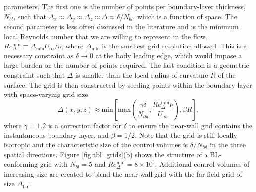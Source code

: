 \documentclass{ctr}
\begin{document}
\begin{itemize}
  parameters. The first one is the number of points per boundary-layer
  thickness, $N_{bl}$, such that $\Delta_x \approx \Delta_y \approx
  \Delta_z \approx \Delta \approx \delta/N_{bl}$, which is a function
  of space.  The second parameter is less often discussed in the
  literature and is the minimum local Reynolds number that we are
  willing to represent in the flow, $Re_{\Delta}^\mathrm{min} \equiv
  \Delta_\mathrm{min} U_\infty/\nu$, where $\Delta_\mathrm{min}$ is
  the smallest grid resolution allowed. This is a necessary constraint
  as $\delta \rightarrow 0$ at the body leading edge, which would
  impose a large burden on the number of points required.  The last
  condition is a geometric constraint such that $\Delta$ is smaller
  than the local radius of curvature $R$ of the surface. The grid is
  then constructed by seeding points within the boundary layer with
  space-varying grid size
  \begin{equation}
    \Delta(x,y,z) \approx \mathrm{min}\left[ \mathrm{max}\left( 
    \frac{\gamma\delta}{N_{tbl}}, \frac{Re_{\Delta}^\mathrm{min} \nu}{U_\infty}\right), \beta R \right],
  \end{equation}
  where $\gamma=1.2$ is a correction factor for $\delta$ to ensure the
  near-wall grid contains the instantaneous boundary layer, and
  $\beta=1/2$. Note that the grid is still locally isotropic and the
  characteristic size of the control volumes is $\delta/N_{tbl}$ in
  the three spatial directions. Figure \ref{fig:tbl_grids}(b) shows
  the structure of a BL-conforming grid with $N_{bl} = 5$
  and $Re_\Delta^\mathrm{min}=8 \times 10^3$. Additional control
  volumes of increasing size are created to blend the near-wall grid
  with the far-field grid of size $\Delta_{\mathrm{far}}$.
\end{itemize}
\end{document}
